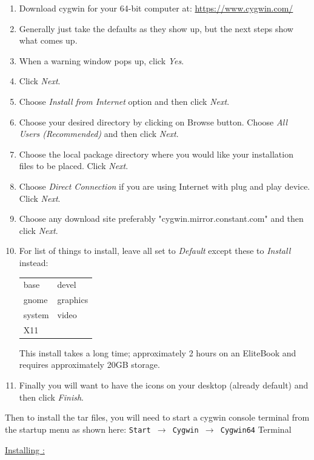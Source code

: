 \begin{enumerate}
	\item Download cygwin for your 64-bit computer at: {\small \url{https://www.cygwin.com/}}
	\item Generally just take the defaults as they show up, but the next steps show what comes up.
	\item When a warning window pops up, click \textit{Yes}.
	\item Click \textit{Next}.
	\item Choose \textit{Install from Internet} option and then click \textit{Next}.
	\item Choose your desired directory by clicking on Browse button. Choose \textit{All Users (Recommended)} and then click \textit{Next}.
	\item Choose the local package directory where you would like your installation files to be placed. Click \textit{Next}.
	\item Choose \textit{Direct Connection} if you are using Internet with plug and play device. Click \textit{Next}.
	\item Choose any download site preferably "cygwin.mirror.constant.com" and then click \textit{Next}.
	\item For list of things to install, leave all set to \textit{Default} except these to \textit{Install} instead:

\begin{tabular}{ll}
	base& devel\\
	gnome& graphics\\
	system& video\\
	X11 \\
\end{tabular}

     This install takes a long time; approximately 2 hours on an EliteBook and requires approximately 20GB storage.
	\item Finally you will want to have the icons on your desktop (already default) and then click \textit{Finish}.
\end{enumerate}

Then to install the \CGG{} tar files, you will need to start a cygwin console terminal from the startup menu as shown here:
	\texttt{Start $\rightarrow$ Cygwin $\rightarrow$ Cygwin64} Terminal

\underline{Installing \CGG{}:}

